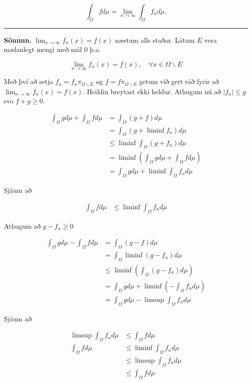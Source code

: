 \documentclass[]{book}
\begin{document}
\[
\int_\Omega fd\mu = \lim_{n\rightarrow\infty}\int_\Omega f_nd\mu.
\]

\begin{center}\rule{0.5\linewidth}{\linethickness}\end{center}

\textbf{Sönnun.} \(\lim_{n\rightarrow\infty}f_n(x) = f(x)\) næstum alls staðar. Látum \(E\) vera mælanlegt mengi með mál 0 þ.a.

\[
\lim_{n\rightarrow\infty}f_n(x) = f(x), \quad \forall x\in \Omega\backslash E
\]

Með því að setja \(f_n = f_n\pi_{\Omega\backslash E}\) og \(f=f\pi_{\Omega\backslash E}\) getum við gert ráð fyrir að \(\lim_{n\rightarrow\infty}f_n(x) = f(x)\). Heildin breytast ekki heldur. Athugum nú að \(|f_n|\leq g\) svo \(f+g\geq0\).

\[
\begin{aligned}
\int_\Omega gd\mu + \int_\Omega fd\mu &= \int_\Omega(g+f)d\mu \\
&= \int_\Omega(g + \liminf f_n)d\mu \\
&\leq \liminf \int_\Omega(g+f_n)d\mu \\
&=\liminf(\int_\Omega gd\mu + \int_\Omega fd\mu) \\
&= \int_\Omega gd\mu + \liminf\int_\Omega f_nd\mu
\end{aligned}
\]

Sjáum að

\[
\begin{aligned}
\int_\Omega fd\mu &\leq \liminf \int_\Omega f_nd\mu 
\end{aligned}
\]

Athugum að \(g - f_n\geq 0\)

\[
\begin{aligned}
\int_\Omega gd\mu - \int_\Omega fd\mu &= \int_\Omega (g - f)d\mu \\
&= \int_\Omega \liminf(g - f_n)d\mu \\
&\leq \liminf(\int_\Omega(g-f_n)d\mu) \\
&= \int_\Omega gd\mu + \liminf(-\int_\Omega f_nd\mu) \\
&= \int_\Omega gd\mu - \limsup\int_\Omega f_nd\mu
\end{aligned}
\]

Sjáum að

\[
\begin{aligned}
\limsup \int_\Omega f_nd\mu &\leq \int_\Omega fd\mu \\
\int_\Omega fd\mu &\leq \liminf\int_\Omega f_nd\mu \\
&\leq \limsup \int_\Omega f_nd\mu \\
&\leq \int_\Omega fd\mu
\end{aligned}
\]
\end{document}

